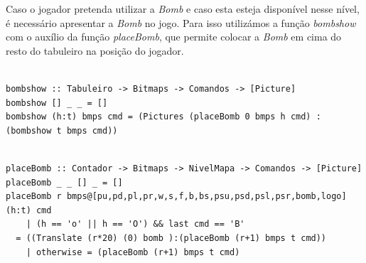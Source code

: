 \documentclass[12pt,a4paper]{report}
\begin{document}
Caso o jogador pretenda utilizar a \emph{Bomb} e caso esta esteja disponível nesse nível, é necessário apresentar a \emph{Bomb} no jogo. Para isso utilizámos a função \emph{bombshow} com o auxílio da função \emph{placeBomb}, que permite colocar a \emph{Bomb} em cima do resto do tabuleiro na posição do jogador.\\

\begin{verbatim}

bombshow :: Tabuleiro -> Bitmaps -> Comandos -> [Picture]
bombshow [] _ _ = []
bombshow (h:t) bmps cmd = (Pictures (placeBomb 0 bmps h cmd) : (bombshow t bmps cmd)) 

\end{verbatim}

\hfill

\begin{verbatim}

placeBomb :: Contador -> Bitmaps -> NivelMapa -> Comandos -> [Picture]
placeBomb _ _ [] _ = []
placeBomb r bmps@[pu,pd,pl,pr,w,s,f,b,bs,psu,psd,psl,psr,bomb,logo] (h:t) cmd
    | (h == 'o' || h == 'O') && last cmd == 'B' 
  = ((Translate (r*20) (0) bomb ):(placeBomb (r+1) bmps t cmd))
    | otherwise = (placeBomb (r+1) bmps t cmd)

\end{verbatim}
\end{document}
